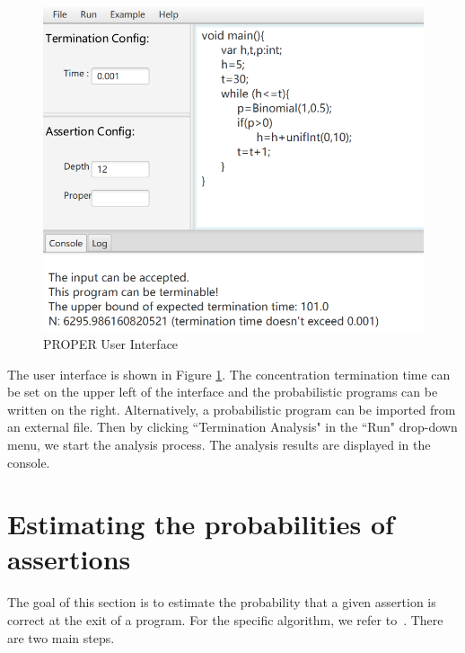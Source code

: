 \documentclass[sigconf,review, anonymous]{acmart}
\begin{document}
\begin{figure}[h]
	\centering
	\includegraphics[scale=0.6]{img/interface}
	\caption{PROPER User Interface}
	\label{interface}
\end{figure}

The user interface is shown in Figure \ref{interface}. The concentration termination time can be set on the upper left of the interface and the probabilistic programs can be written on the right. Alternatively, a probabilistic program  can be imported from an external file. 
Then by clicking ``Termination Analysis" in the ``Run" drop-down menu, we start the analysis process. The analysis results are displayed in the console. 


\section{Estimating the probabilities of assertions}
The goal of this section is to estimate the probability that a given assertion is correct at the exit of a program. For the specific algorithm, we refer to~\cite{Sankaranarayanan2013Static}. There are two main steps.
\end{document}
